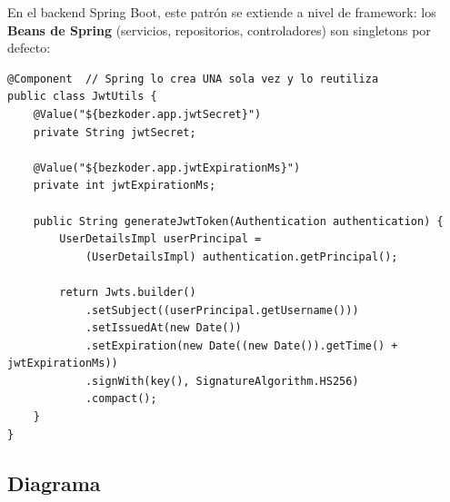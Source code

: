 \documentclass[12pt,a4paper]{article}
\begin{document}
En el backend Spring Boot, este patr\'on se extiende a nivel de framework: los \textbf{Beans de Spring} (servicios, repositorios, controladores) son singletons por defecto:

\begin{lstlisting}[caption={JwtUtils.java -- Bean Singleton gestionado por Spring}]
@Component  // Spring lo crea UNA sola vez y lo reutiliza
public class JwtUtils {
    @Value("${bezkoder.app.jwtSecret}")
    private String jwtSecret;

    @Value("${bezkoder.app.jwtExpirationMs}")
    private int jwtExpirationMs;

    public String generateJwtToken(Authentication authentication) {
        UserDetailsImpl userPrincipal =
            (UserDetailsImpl) authentication.getPrincipal();

        return Jwts.builder()
            .setSubject((userPrincipal.getUsername()))
            .setIssuedAt(new Date())
            .setExpiration(new Date((new Date()).getTime() + jwtExpirationMs))
            .signWith(key(), SignatureAlgorithm.HS256)
            .compact();
    }
}
\end{lstlisting}

\subsection{Diagrama}

\begin{center}
\end{center}
\end{document}
